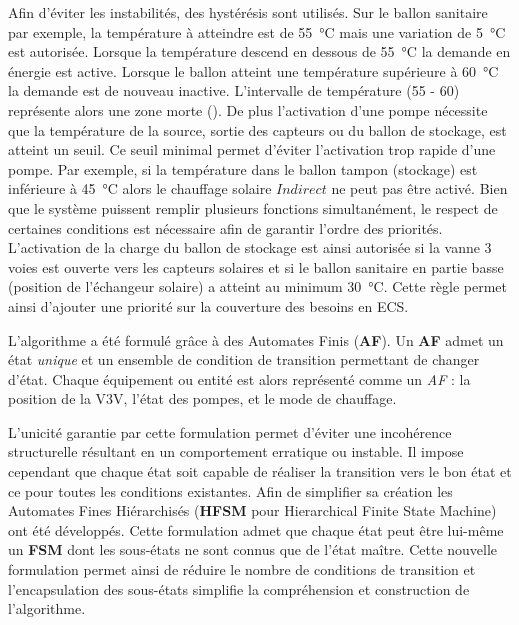 Afin d’éviter les instabilités, des hystérésis sont utilisés. Sur le ballon sanitaire par
exemple, la température à atteindre est de \SI{55}{\celsius} mais une variation de
\SI{5}{\celsius} est autorisée. Lorsque la température descend en dessous de
\SI{55}{\celsius} la demande en énergie est active. Lorsque le ballon atteint une
température supérieure à \SI{60}{\celsius} la demande est de nouveau inactive.
L’intervalle de température (55 - 60) représente alors une zone morte ().
De plus l’activation d’une pompe nécessite que la température de la source, sortie des
capteurs ou du ballon de stockage, est atteint un seuil. Ce seuil minimal permet d’éviter
l’activation trop rapide d’une pompe. Par exemple, si la température dans le ballon tampon
(stockage) est inférieure à \SI{45}{\celsius} alors le chauffage solaire $Indirect$ ne
peut pas être activé. Bien que le système puissent remplir plusieurs fonctions
simultanément, le respect de certaines conditions est nécessaire afin de garantir l’ordre
des priorités. L’activation de la charge du ballon de stockage est ainsi autorisée si la
vanne 3 voies est ouverte vers les capteurs solaires et si le ballon sanitaire en partie
basse (position de l’échangeur solaire) a atteint au minimum \SI{30}{\celsius}. Cette
règle permet ainsi d’ajouter une priorité sur la couverture des besoins en ECS.

L’algorithme a été formulé grâce à des Automates Finis (\textbf{AF}). Un \textbf{AF}
admet un état \emph{unique} et un ensemble de condition de transition permettant
de changer d’état. Chaque équipement ou entité est alors représenté comme un \emph{AF} : la
position de la V3V, l’état des pompes, et le mode de chauffage.

L’unicité garantie par cette formulation permet d’éviter une incohérence structurelle
résultant en un comportement erratique ou instable. Il impose cependant que chaque état
soit capable de réaliser la transition vers le bon état et ce pour toutes les conditions
existantes. Afin de simplifier sa création les Automates Fines Hiérarchisés (\textbf{HFSM}
pour Hierarchical Finite State Machine) ont été développés. Cette formulation admet que
chaque état peut être lui-même un \textbf{FSM} dont les sous-états ne sont connus que de
l’état maître. Cette nouvelle formulation permet ainsi de réduire le nombre de conditions
de transition et l’encapsulation des sous-états simplifie la compréhension et construction
de l’algorithme.


